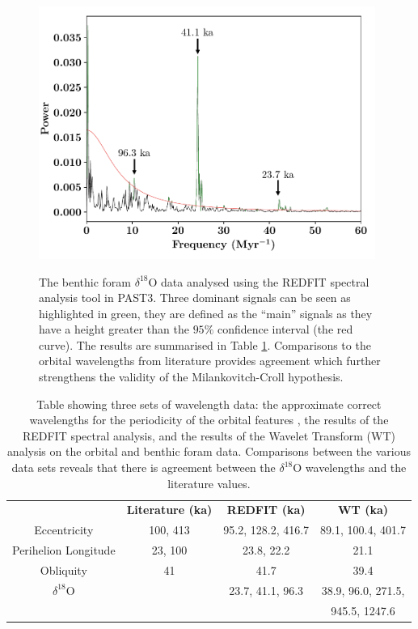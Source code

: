 \documentclass[12pt, onecolumn]{revtex4}    %
\begin{document}
\begin{figure}[!h]
\begin{center}
\includegraphics[width=11cm]{figures/d18O_redfit}
\caption[]{The benthic foram $\delta^{18}$O data analysed using the REDFIT spectral analysis tool in PAST3. Three dominant signals can be seen as highlighted in green, they are defined as the ``main'' signals as they have a height greater than the $95\%$ confidence interval (the red curve). The results are summarised in Table \ref{table:final_results}. Comparisons to the orbital wavelengths from literature provides agreement which further strengthens the validity of the Milankovitch-Croll hypothesis.}
\vspace{-3ex}
\label{fig:d18o_redfit}
\end{center}
\end{figure}

\begin{table}[h!]
\centering
\begin{tabular}{c@{\hskip 20pt}c@{\hskip 20pt}c@{\hskip 20pt}c} 
 \hline
  & \textbf{Literature (ka)} &\textbf{REDFIT (ka)} & \textbf{WT (ka)} \\ [0.5ex] 
 Eccentricity & 100, 413 & 95.2, 128.2, 416.7 & 89.1, 100.4,  401.7\\
 Perihelion Longitude & 23, 100 & 23.8, 22.2 & 21.1 \\
 Obliquity & 41 & 41.7 & 39.4 \\
 $\delta^{18}$O & & 23.7, 41.1, 96.3  & 38.9, 96.0, 271.5, \\
 & & & 945.5, 1247.6 \\
 \hline
\end{tabular}
\caption{Table showing three sets of wavelength data: the approximate correct wavelengths for the periodicity of the orbital features \cite{campisano_milankovitch}, the results of the REDFIT spectral analysis, and the results of the Wavelet Transform (WT) analysis on the orbital and benthic foram data. Comparisons between the various data sets reveals that there is agreement between the $\delta^{18}$O wavelengths and the literature values. }
\vspace{-0.5em}
\label{table:final_results}
\end{table}
\end{document}
